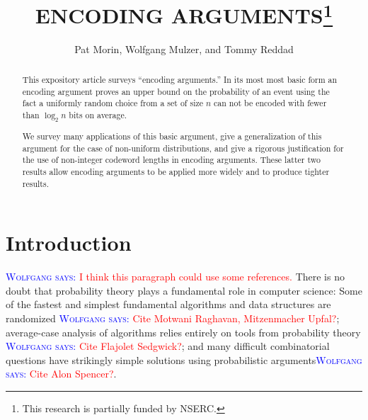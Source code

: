 \documentclass{patmorin}
\title{\MakeUppercase{Encoding Arguments}\thanks{This research is partially funded by NSERC.}}
\author{Pat Morin, Wolfgang Mulzer, and Tommy Reddad}
\date{}
\newcommand{\aremark}[3]{\textcolor{blue}{\textsc{#1 #2:}}
  \textcolor{red}{\textsf{#3}}}
\newcommand{\wolfgang}[2][says]{\aremark{Wolfgang}{#1}{#2}}
\begin{document}
\begin{titlepage}
\maketitle


\begin{abstract}
  \setlength{\baselineskip}{15.84pt}

  This expository article surveys ``encoding arguments.'' In its
  most most basic form an encoding argument proves an upper bound on
  the probability of an event using the fact a uniformly random choice
  from a set of size $n$ can not be encoded with fewer than $\log_2 n$
  bits on average.

  We survey many applications of this basic argument, give a
  generalization of this argument for the case of non-uniform
  distributions, and give a rigorous justification for the use of
  non-integer codeword lengths in encoding arguments.  These latter
  two results allow encoding arguments to be applied more widely and
  to produce tighter results.
\end{abstract}


\end{titlepage}
\tableofcontents
\newpage
{}

\section{Introduction}
\setlength{\baselineskip}{15.84pt}

\wolfgang{I think this paragraph could use some references.}
There is no doubt that probability theory plays a fundamental role in
computer science: Some of the fastest and simplest fundamental
algorithms and data structures are randomized
\wolfgang{Cite Motwani Raghavan, Mitzenmacher Upfal?}\cite{mitzenmacher.upfal:probability, motwani.raghavan:randomized}; average-case analysis
of algorithms relies entirely on tools from probability theory
\wolfgang{Cite Flajolet Sedgwick?}\cite{flajolet.sedgewick:aofa}; and
many difficult combinatorial questions have strikingly simple
solutions using probabilistic arguments\wolfgang{Cite Alon Spencer?}\cite{alon:probabilistic}.
\end{document}
